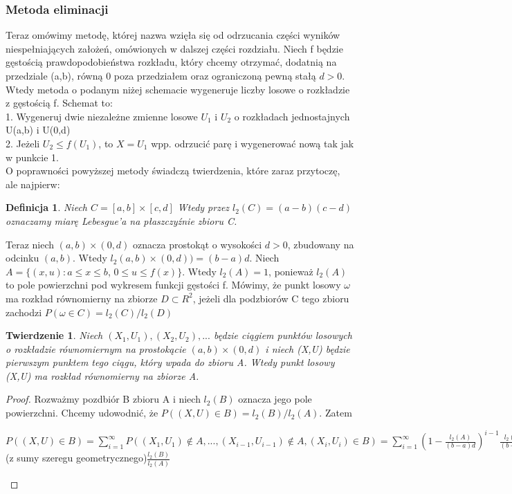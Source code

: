 \documentclass[a4paper]{scrartcl}
\newtheorem{definition}{Definicja}
\newtheorem{theorem}{Twierdzenie}
\begin{document}
\subsubsection{Metoda eliminacji}
\qquad Teraz omówimy metodę, której nazwa wzięła się od odrzucania części wyników niespełniających założeń, omówionych w dalszej części rozdziału. Niech f będzie gęstością prawdopodobieństwa rozkładu, który chcemy otrzymać, dodatnią na przedziale (a,b), równą 0 poza przedziałem oraz ograniczoną pewną stałą $d>0$. Wtedy metoda o podanym niżej schemacie wygeneruje liczby losowe o rozkładzie z gęstością f. Schemat to:\\
1. Wygeneruj dwie niezależne zmienne losowe $U_1$ i $U_2$ o rozkładach jednostajnych U(a,b) i U(0,d)\\
2. Jeżeli $U_2\leq f(U_1)$, to $X=U_1$ wpp. odrzucić parę i wygenerować nową tak jak w punkcie 1.\\
O poprawności powyższej metody świadczą twierdzenia, które zaraz przytoczę, ale najpierw:
\begin{definition}
Niech $C=[a,b] \times [c,d]$ Wtedy przez $l_2(C)=(a-b)(c-d)$ oznaczamy miarę Lebesgue'a na płaszczyźnie zbioru C.
\end{definition}
Teraz niech $(a,b) \times (0, d)$ oznacza prostokąt o wysokości $d>0$, zbudowany na odcinku $(a,b)$. Wtedy $l_2(a,b) \times (0,d))=(b-a)d$.
Niech $A=\{(x,u): a\leq x \leq b$, $0 \leq u \leq f(x)\}$. Wtedy $l_2(A)=1$, ponieważ $l_2(A)$ to pole powierzchni pod wykresem funkcji gęstości f. Mówimy, że punkt losowy $\omega$ ma rozkład równomierny na zbiorze $D \subset R^2$, jeżeli dla podzbiorów C tego zbioru zachodzi $P(\omega \in C)=l_2(C)/l_2(D)$
\begin{theorem}
Niech $(X_1, U_1), (X_2, U_2), ...$ będzie ciągiem punktów losowych o rozkładzie równomiernym na prostokącie $(a,b) \times (0,d)$ i niech (X,U) będzie pierwszym punktem tego ciągu, który wpada do zbioru A. Wtedy punkt losowy (X,U) ma rozkład równomierny na zbiorze A.
\end{theorem}
\begin{proof}
Rozważmy pozdbiór B zbioru A i niech $l_2(B)$ oznacza jego pole powierzchni. Chcemy udowodnić, że $P((X,U) \in B) = l_2(B)/l_2(A)$. Zatem
\begin{center}
$P((X,U) \in B) = \sum_{i=1}^\infty P((X_1, U_1) \notin A, ..., (X_{i-1}, U_{i-1}) \notin A, (X_i, U_i) \in B) = \sum_{i=1}^\infty (1 - \frac{l_2(A)}{(b-a)d})^{i-1}\frac{l_2(B)}{(b-a)d} = $(z sumy szeregu geometrycznego)$\frac{l_2(B)}{l_2(A)}$
\end{center}
\end{proof}
\end{document}
